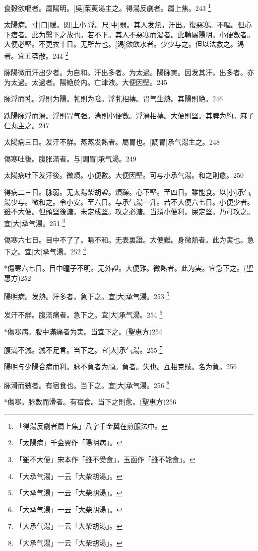 \documentclass[12pt,twoside,UTF8,b5paper]{ctexbook}
\begin{document}
食穀欲嘔者。屬陽明。[吳]茱萸湯主之。得湯反劇者。屬上焦。243
	\footnote{「得湯反劇者屬上焦」八字千金翼在煎服法中。}

太陽病。寸[口]緩。関[上小]浮。尺[中]弱。其人发熱。汗出。復惡寒。不嘔。但心下痞者。此为醫下之故也。若不下。其人不惡寒而渴者。此轉屬陽明。小便數者。大便必堅。不更衣十日。无所苦也。[渴]欲飲水者。少少与之。但以法救之。渴者。宜五苓散。244
	\footnote{「太陽病」千金翼作「陽明病」。}

脉陽微而汗出少者。为自和。汗出多者。为太過。陽脉実。因发其汗。出多者。亦为太過。太過者。陽絶於内。亡津液。大便因堅。245

脉浮而芤。浮則为陽。芤則为陰。浮芤相摶。胃气生熱。其陽則絶。246

跌陽脉浮而濇。浮則胃气强。濇則小便數。浮濇相摶。大便則堅。其脾为約。麻子仁丸主之。247

太陽病三日。发汗不觧。蒸蒸发熱者。屬胃也。[調胃]承气湯主之。248

傷寒吐後。腹胀滿者。与[調胃]承气湯。249

太陽病吐下发汗後。微煩。小便數。大便因堅。可与小承气湯。和之則愈。250

得病二三日。脉弱。无太陽柴胡證。煩躁。心下堅。至四日。雖能食。以[小]承气湯少与。微和之。令小安。至六日。与承气湯一升。若不大便六七日。小便少者。雖不大便。但頭堅後溏。未定成堅。攻之必溏。当須小便利。屎定堅。乃可攻之。宜[大]承气湯。251
	\footnote{「雖不大便」宋本作「雖不受食」，玉函作「雖不能食」。}

傷寒六七日。目中不了了。睛不和。无表裏證。大便難。身微熱者。此为実也。急下之。宜[大]承气湯。252
	\footnote{「大承气湯」一云「大柴胡湯」。}

*傷寒六七日。目中瞳子不明。无外證。大便難。微熱者。此为実。宜急下之。(聖惠方)252

陽明病。发熱。汗多者。急下之。宜[大]承气湯。253
	\footnote{「大承气湯」一云「大柴胡湯」。}

发汗不觧。腹滿痛者。急下之。宜[大]承气湯。254
	\footnote{「大承气湯」一云「大柴胡湯」。}

*傷寒病。腹中滿痛者为実。当宜下之。(聖惠方)254

腹滿不減。減不足言。当下之。宜[大]承气湯。255
	\footnote{「大承气湯」一云「大柴胡湯」。}

陽明与少陽合病而利。脉不負者为順。負者。失也。互相克賊。名为負。256

脉滑而數者。有宿食也。当下之。宜[大]承气湯。256
	\footnote{「大承气湯」一云「大柴胡湯」。}

*傷寒。脉數而滑者。有宿食。当下之則愈。(聖惠方)256
\end{document}
